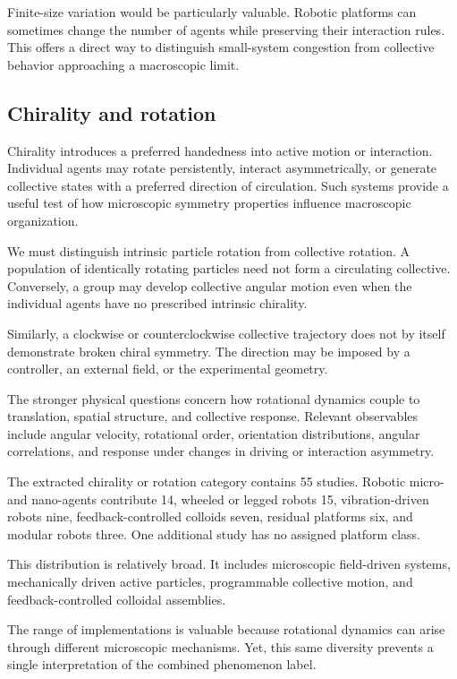 Finite-size variation
would be particularly
valuable. Robotic
platforms can sometimes
change the number
of agents while
preserving their
interaction rules.
This offers a direct
way to distinguish
small-system congestion
from collective
behavior approaching
a macroscopic limit.

\subsection{Chirality and rotation}
\label{sec:phenomena-chirality}

Chirality introduces a preferred handedness into
active motion or interaction. Individual agents
may rotate persistently, interact asymmetrically,
or generate collective states with a preferred
direction of circulation. Such systems provide
a useful test of how microscopic symmetry
properties influence macroscopic organization.

We must distinguish intrinsic particle rotation
from collective rotation. A population of
identically rotating particles need not
form a circulating collective. Conversely,
a group may develop collective angular
motion even when the individual agents
have no prescribed intrinsic chirality.

Similarly, a clockwise or counterclockwise
collective trajectory does not by itself
demonstrate broken chiral symmetry.
The direction may be imposed by
a controller, an external field,
or the experimental geometry.

The stronger physical questions concern
how rotational dynamics couple to
translation, spatial structure,
and collective response. Relevant
observables include angular velocity,
rotational order, orientation
distributions, angular correlations,
and response under changes
in driving or interaction asymmetry.

The extracted chirality or rotation
category contains 55 studies.
Robotic micro- and nano-agents
contribute 14, wheeled or legged
robots 15, vibration-driven
robots nine, feedback-controlled
colloids seven, residual
platforms six, and modular
robots three. One additional
study has no assigned
platform class.

This distribution is relatively
broad. It includes microscopic
field-driven systems, mechanically
driven active particles,
programmable collective motion,
and feedback-controlled
colloidal assemblies.

The range of implementations
is valuable because rotational
dynamics can arise through
different microscopic mechanisms.
Yet, this same diversity
prevents a single interpretation
of the combined phenomenon label.

